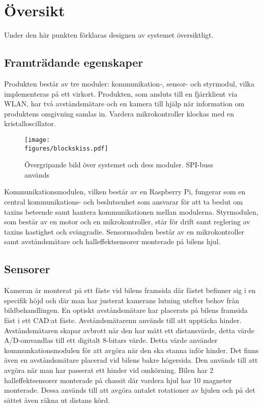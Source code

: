\documentclass[tekniskrapport/tech.tex]{subfiles}
\begin{document}
\section{Översikt}
Under den här punkten förklaras designen av systemet översiktligt.

\subsection{Framträdande egenskaper}
Produkten består av tre moduler: kommunikation-, sensor- och styrmodul, vilka
implementeras på ett virkort. Produkten, som ansluts till en fjärrklient via
WLAN, har två avståndsmätare och en kamera till hjälp när information om
produktens omgivning samlas in. Vardera mikrokontroller klockas med en
kristalloscillator.

\begin{figure}[h]
    \centering
    \texttt{[image: \\figures/blockskiss.pdf]}
    \caption{Övergripande bild över systemet och dess moduler. SPI-buss används}
    \label{fig:overview}
\end{figure}

\noindent
Kommunikationsmodulen, vilken består av en Raspberry Pi, fungerar som en
central kommun\-ikations- och beslutsenhet som ansvarar för att ta beslut om
taxins beteende samt hantera kommunikationen mellan modulerna. Styrmodulen,
som består av en motor och en mikrokontroller, står för drift samt reglering
av taxins hastighet och svängradie. Sensormodulen består av en mikrokontroller
samt avståndsmätare och halleffektsensorer monterade på bilens hjul.

\subsection{Sensorer}
Kameran är monterat på ett fäste vid bilens framsida där fästet befinner sig i
en specifik höjd och där man har justerat kamerans lutning utefter behov från
bildbehandlingen. En optiskt avståndsmätare har placerats på bilens framsida
fäst i ett CAD:at fäste. Avståndsmätarenn används till att upptäcka hinder.
Avståndsmätaren skapar avbrott när den har mätt ett distansvärde, detta värde
A/D-omvandlas till ett digitalt 8-bitars värde. Detta värde använder
kommunkationsmodulen för att avgöra när den ska stanna inför hinder. Det finns
även en avståndsmätare placerad vid bilens bakre högersida. Den används till att
avgöra när man har passerat ett hinder vid omkörning. Bilen har 2
halleffektsensorer monterade på chassit där vardera hjul har 10 magneter
monterade. Dessa används till att avgöra antalet rotationer av hjulen och på det
sättet även räkna ut distans körd.
\end{document}
